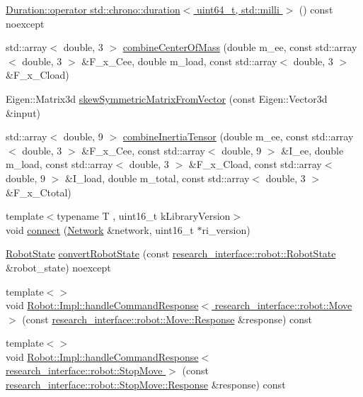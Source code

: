 \begin{DoxyCompactItemize}
\item 
\hyperlink{namespacefranka_af66b76866e831af19875a3d66f24da49}{Duration\+::operator std\+::chrono\+::duration$<$ uint64\+\_\+t, std\+::milli $>$} () const noexcept
\item 
std\+::array$<$ double, 3 $>$ \hyperlink{namespacefranka_a92a802942d91aff279534b952468dc51}{combine\+Center\+Of\+Mass} (double m\+\_\+ee, const std\+::array$<$ double, 3 $>$ \&F\+\_\+x\+\_\+\+Cee, double m\+\_\+load, const std\+::array$<$ double, 3 $>$ \&F\+\_\+x\+\_\+\+Cload)
\item 
Eigen\+::\+Matrix3d \hyperlink{namespacefranka_a503ad33c66091a201a92c1262778d16f}{skew\+Symmetric\+Matrix\+From\+Vector} (const Eigen\+::\+Vector3d \&input)
\item 
std\+::array$<$ double, 9 $>$ \hyperlink{namespacefranka_a4be229abc6da1b78167353e5448ea1d5}{combine\+Inertia\+Tensor} (double m\+\_\+ee, const std\+::array$<$ double, 3 $>$ \&F\+\_\+x\+\_\+\+Cee, const std\+::array$<$ double, 9 $>$ \&I\+\_\+ee, double m\+\_\+load, const std\+::array$<$ double, 3 $>$ \&F\+\_\+x\+\_\+\+Cload, const std\+::array$<$ double, 9 $>$ \&I\+\_\+load, double m\+\_\+total, const std\+::array$<$ double, 3 $>$ \&F\+\_\+x\+\_\+\+Ctotal)
\item 
{\footnotesize template$<$typename T , uint16\+\_\+t k\+Library\+Version$>$ }\\void \hyperlink{namespacefranka_a3e41d6a4328598c51909546b0e701179}{connect} (\hyperlink{classfranka_1_1Network}{Network} \&network, uint16\+\_\+t $\ast$ri\+\_\+version)
\item 
\hyperlink{structfranka_1_1RobotState}{Robot\+State} \hyperlink{namespacefranka_a0eaee201f8afdb02f6530269cb581cbb}{convert\+Robot\+State} (const \hyperlink{structresearch__interface_1_1robot_1_1RobotState}{research\+\_\+interface\+::robot\+::\+Robot\+State} \&robot\+\_\+state) noexcept
\item 
{\footnotesize template$<$$>$ }\\void \hyperlink{namespacefranka_a5a8aedd505670843172f84593054c094}{Robot\+::\+Impl\+::handle\+Command\+Response$<$ research\+\_\+interface\+::robot\+::\+Move $>$} (const \hyperlink{structresearch__interface_1_1robot_1_1CommandBase_ae8b503e2bc7d72e70b6eb08421e0d853}{research\+\_\+interface\+::robot\+::\+Move\+::\+Response} \&response) const
\item 
{\footnotesize template$<$$>$ }\\void \hyperlink{namespacefranka_a09b33e685728ad5f233cf81ca0e0a8c2}{Robot\+::\+Impl\+::handle\+Command\+Response$<$ research\+\_\+interface\+::robot\+::\+Stop\+Move $>$} (const \hyperlink{structresearch__interface_1_1robot_1_1CommandBase_ae8b503e2bc7d72e70b6eb08421e0d853}{research\+\_\+interface\+::robot\+::\+Stop\+Move\+::\+Response} \&response) const

\end{DoxyCompactItemize}
